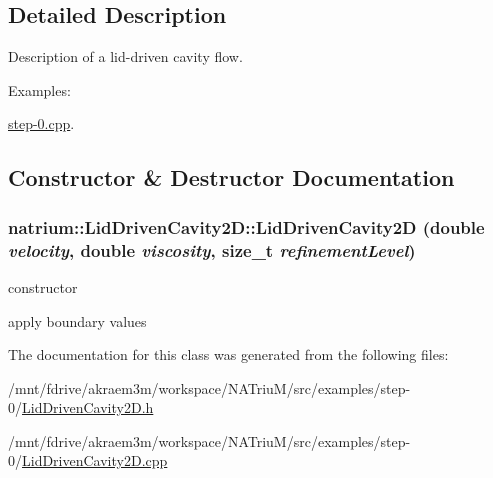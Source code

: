 \subsection{Detailed Description}
Description of a lid-\/driven cavity flow. \begin{Desc}
\item[Examples: ]\par


\hyperlink{step-0_8cpp-example}{step-\/0.cpp}.\end{Desc}


\subsection{Constructor \& Destructor Documentation}
\hypertarget{classnatrium_1_1LidDrivenCavity2D_a139fe700f3e871e1b51eada1a41c69b1}{
\subsubsection[{LidDrivenCavity2D}]{\setlength{\rightskip}{0pt plus 5cm}natrium::LidDrivenCavity2D::LidDrivenCavity2D (double {\em velocity}, \/  double {\em viscosity}, \/  size\_\-t {\em refinementLevel})}}
\label{classnatrium_1_1LidDrivenCavity2D_a139fe700f3e871e1b51eada1a41c69b1}


constructor 

apply boundary values 

The documentation for this class was generated from the following files:\begin{DoxyCompactItemize}
\item 
/mnt/fdrive/akraem3m/workspace/NATriuM/src/examples/step-\/0/\hyperlink{LidDrivenCavity2D_8h}{LidDrivenCavity2D.h}\item 
/mnt/fdrive/akraem3m/workspace/NATriuM/src/examples/step-\/0/\hyperlink{LidDrivenCavity2D_8cpp}{LidDrivenCavity2D.cpp}\end{DoxyCompactItemize}
